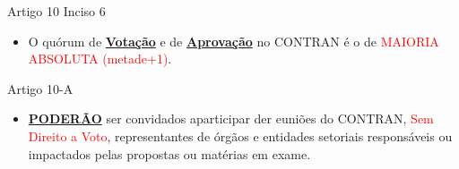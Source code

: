 \documentclass{beamer}
\begin{document}
\begin{frame}{Artigo 10 Inciso 6}
    \begin{itemize}
        \item \justifying O quórum de \textbf{\underline{Votação}} e de \textbf{\underline{Aprovação}} no CONTRAN é o de \textcolor{red}{MAIORIA ABSOLUTA (metade+1)}.
    \end{itemize}
\end{frame}
\begin{frame}{Artigo 10-A}
    \begin{itemize}
        \item \justifying \textbf{\underline{PODERÃO}} ser convidados aparticipar der euniões do CONTRAN, \textcolor{red}{Sem Direito a Voto}, representantes de órgãos e entidades setoriais responsáveis ou impactados pelas propostas ou matérias em exame.
    \end{itemize}
\end{frame}
\end{document}
